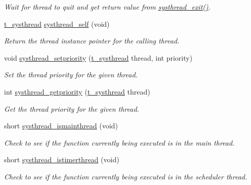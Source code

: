 \begin{DoxyCompactItemize}
\begin{DoxyCompactList}\small\item\em Wait for thread to quit and get return value from \hyperlink{group__threading_gad448ff5be27ef8233162a0e24751786f}{systhread\_\-exit()}. \item\end{DoxyCompactList}\item 
\hyperlink{group__threading_gaaf0068b8e9ac28430873484727029315}{t\_\-systhread} \hyperlink{group__threading_gab76eb3e1668b13483533c4929be5c914}{systhread\_\-self} (void)
\begin{DoxyCompactList}\small\item\em Return the thread instance pointer for the calling thread. \item\end{DoxyCompactList}\item 
void \hyperlink{group__threading_ga4e4b35c628d791550e5523c4b554d466}{systhread\_\-setpriority} (\hyperlink{group__threading_gaaf0068b8e9ac28430873484727029315}{t\_\-systhread} thread, int priority)
\begin{DoxyCompactList}\small\item\em Set the thread priority for the given thread. \item\end{DoxyCompactList}\item 
int \hyperlink{group__threading_gaf073584f030cffc3a823601173803a95}{systhread\_\-getpriority} (\hyperlink{group__threading_gaaf0068b8e9ac28430873484727029315}{t\_\-systhread} thread)
\begin{DoxyCompactList}\small\item\em Get the thread priority for the given thread. \item\end{DoxyCompactList}\item 
short \hyperlink{group__threading_ga7ed1192e20bccddec517591b4a5f0f91}{systhread\_\-ismainthread} (void)
\begin{DoxyCompactList}\small\item\em Check to see if the function currently being executed is in the main thread. \item\end{DoxyCompactList}\item 
short \hyperlink{group__threading_ga9bc306a6b164f705e55d1612c5ccfb78}{systhread\_\-istimerthread} (void)
\begin{DoxyCompactList}\small\item\em Check to see if the function currently being executed is in the scheduler thread. \item\end{DoxyCompactList}\end{DoxyCompactItemize}



